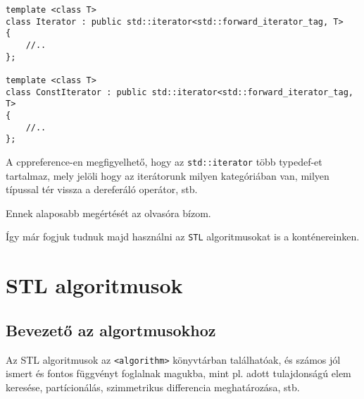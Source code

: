 \documentclass[a4paper,11.5pt,table]{article}
\begin{document}
	\begin{lstlisting}
template <class T>
class Iterator : public std::iterator<std::forward_iterator_tag, T>
{
	//..
};

template <class T>
class ConstIterator : public std::iterator<std::forward_iterator_tag, T>
{
	//..
};
	\end{lstlisting}
	A cppreference-en megfigyelhető, hogy az \texttt{std::iterator} több typedef-et tartalmaz, mely jelöli hogy az iterátorunk milyen kategóriában van, milyen típussal tér vissza a dereferáló operátor, stb.
	\begin{note}
		Ennek alaposabb megértését az olvasóra bízom.
	\end{note}
	Így már fogjuk tudnuk majd használni az \texttt{STL} algoritmusokat is a konténereinken. 
%		
	
	\section{STL algoritmusok}
	\subsection{Bevezető az algortmusokhoz}
	Az STL algoritmusok az \texttt{<algorithm>} könyvtárban találhatóak, és számos jól ismert és fontos függvényt foglalnak magukba, mint pl. adott tulajdonságú elem keresése, partícionálás, szimmetrikus differencia meghatározása, stb.
	\medskip
	
\end{document}
